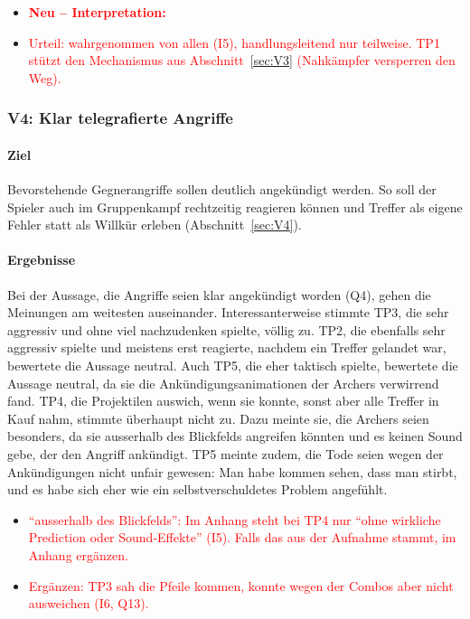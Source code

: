 \documentclass[../Main.tex]{subfiles}
\begin{document}
\begin{itemize}[leftmargin=1.5cm]
    \item \textcolor{red}{\textbf{Neu -- Interpretation:}}
    \item \textcolor{red}{Urteil: wahrgenommen von allen (I5), handlungsleitend nur teilweise. TP1 stützt den Mechanismus aus Abschnitt~\ref{sec:V3} (Nahkämpfer versperren den Weg).}
\end{itemize}

\subsubsection{V4: Klar telegrafierte Angriffe}

\paragraph{Ziel}
Bevorstehende Gegnerangriffe sollen deutlich angekündigt werden. So soll der Spieler auch im Gruppenkampf rechtzeitig reagieren können und Treffer als eigene Fehler statt als Willkür erleben (Abschnitt~\ref{sec:V4}).

\paragraph{Ergebnisse}
Bei der Aussage, die Angriffe seien klar angekündigt worden (Q4), gehen die Meinungen am weitesten auseinander. Interessanterweise stimmte TP3, die sehr aggressiv und ohne viel nachzudenken spielte, völlig zu. TP2, die ebenfalls sehr aggressiv spielte und meistens erst reagierte, nachdem ein Treffer gelandet war, bewertete die Aussage neutral. Auch TP5, die eher taktisch spielte, bewertete die Aussage neutral, da sie die Ankündigungsanimationen der Archers verwirrend fand. TP4, die Projektilen auswich, wenn sie konnte, sonst aber alle Treffer in Kauf nahm, stimmte überhaupt nicht zu. Dazu meinte sie, die Archers seien besonders, da sie ausserhalb des Blickfelds angreifen könnten und es keinen Sound gebe, der den Angriff ankündigt. TP5 meinte zudem, die Tode seien wegen der Ankündigungen nicht unfair gewesen: Man habe kommen sehen, dass man stirbt, und es habe sich eher wie ein selbstverschuldetes Problem angefühlt.

\begin{itemize}[leftmargin=1.5cm]
    \item \textcolor{red}{\enquote{ausserhalb des Blickfelds}: Im Anhang steht bei TP4 nur \enquote{ohne wirkliche Prediction oder Sound-Effekte} (I5). Falls das aus der Aufnahme stammt, im Anhang ergänzen.}
    \item \textcolor{red}{Ergänzen: TP3 sah die Pfeile kommen, konnte wegen der Combos aber nicht ausweichen (I6, Q13).}
\end{itemize}
\end{document}
